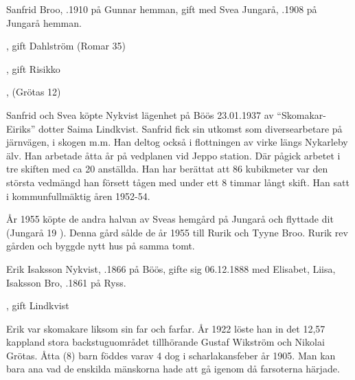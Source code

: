 Sanfrid Broo, .1910 på Gunnar hemman, gift med Svea Jungarå, .1908 på Jungarå hemman.
\begin{jhchildren}
  \item {}, gift Dahlström (Romar 35)
  \item {}, gift Risikko
  \item {}, (Grötas 12)
\end{jhchildren}
Sanfrid och Svea köpte Nykvist lägenhet på Böös 23.01.1937 av ``Skomakar-Eiriks'' dotter Saima Lindkvist. Sanfrid fick sin utkomst som diversearbetare på järnvägen, i skogen m.m.	Han deltog också i flottningen av virke längs Nykarleby älv. Han arbetade åtta år på vedplanen vid Jeppo station. Där pågick arbetet i tre skiften med ca 20 anställda. Han har berättat att 86 kubikmeter var den största vedmängd han försett tågen med under ett 8 timmar långt skift. Han satt i kommunfullmäktig åren 1952-54.

År 1955 köpte de andra halvan av Sveas hemgård på Jungarå och flyttade dit (Jungarå  19 ). Denna  gård sålde de år 1955 till Rurik och Tyyne Broo. Rurik rev gården och byggde nytt hus på samma tomt.


Erik Isaksson Nykvist, .1866 på Böös, gifte sig 06.12.1888 med Elisabet, Liisa, Isaksson Bro, .1861 på Ryss.
\begin{jhchildren}
  \item {}
  \item {}
  \item {}
  \item {}
  \item {}
  \item {}
  \item {}
  \item {}, gift Lindkvist
\end{jhchildren}
Erik var skomakare liksom sin far och farfar. År 1922 löste han in det 12,57 kappland stora backstuguområdet tillhörande Gustaf Wikström 	och Nikolai Grötas. Åtta (8) barn föddes varav 4 dog i scharlakansfeber år 1905. Man kan bara ana vad de enskilda mänskorna hade att gå igenom då farsoterna härjade.

